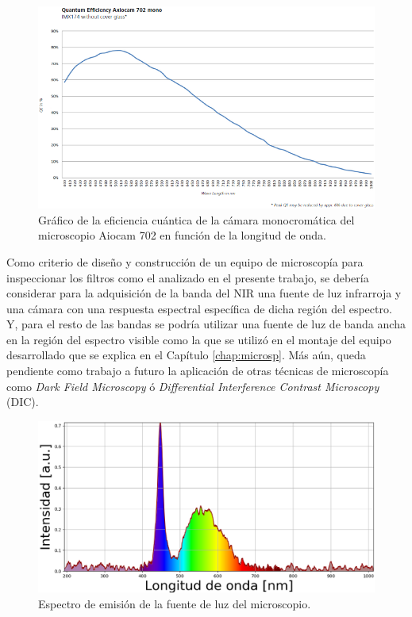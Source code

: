 \begin{figure}[H]
	\centering
	\includegraphics[width=1.0\textwidth]{Figs/defectosZEISS/eficienciacuanticacamarazeiss.png}
	\caption{Gráfico de la eficiencia cuántica de la cámara monocromática del microscopio Aiocam 702 en función de la longitud de onda.}
	\label{fig:eficienciacuanticamara}
\end{figure}
Como criterio de diseño y construcción de un equipo de microscopía para inspeccionar los filtros como el analizado en el presente trabajo, se debería considerar para la adquisición de la banda del NIR una fuente de luz infrarroja y una cámara con una respuesta espectral específica de dicha región del espectro. Y, para el resto de las bandas se podría utilizar una fuente de luz de banda ancha en la región del espectro visible como la que se utilizó en el montaje del equipo desarrollado que se explica en el Capítulo \ref{chap:microsp}. Más aún, queda pendiente como trabajo a futuro la aplicación de otras técnicas de microscopía como \textit{Dark Field Microscopy} ó \textit{Differential Interference Contrast Microscopy} (DIC).
\begin{figure}[H]
	\centering
	\includegraphics[width=1.0\textwidth]{Figs/defectosZEISS/espectrolampZEISS.png}
	\caption{Espectro de emisión de la fuente de luz del microscopio.}
	\label{fig:espectrolamparazeiss}
\end{figure}


